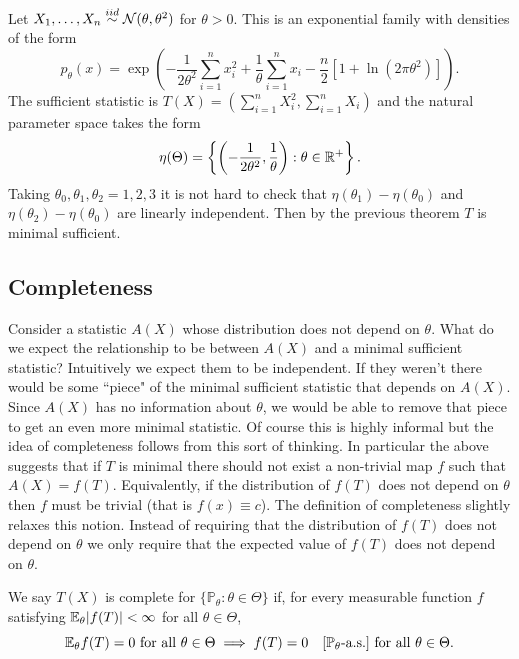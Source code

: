 \begin{example}
	Let $X_1, \dots, X_n \overset{iid}{\sim} \mathcal N(\theta, \theta^2)$ for $\theta > 0$. This is an exponential family with densities of the form \[
	p_\theta(x) =  \exp\left({-\frac{1}{2\theta^2} \sum_{i=1}^n x_i^2  +\frac{1}{\theta}\sum_{i=1}^n x_i} - \frac{n}{2}[1+  \ln(2\pi\theta^2)] \right).
	\] The sufficient statistic is $T(X) = \left(\sum_{i=1}^n X_i^2, \sum_{i=1}^n X_i \right) $ and the natural parameter space takes the form \[
	\eta(\Theta) = \left\{\left(-\frac{1}{2\theta^2}, \frac{1}{\theta}\right) : \theta \in \mathbb{R}^+\right\}. 
	\] Taking $\theta_0, \theta_1, \theta_2 = 1, 2, 3$  it is not hard to check that $\eta(\theta_1) - \eta(\theta_0)$ and $\eta(\theta_2) - \eta(\theta_0)$ are linearly independent.  Then by the previous theorem $T$ is minimal sufficient.
\end{example}

\subsection{Completeness}

Consider a statistic $A(X)$ whose distribution does not depend on $\theta$. What do we expect the relationship to be between $A(X)$ and a minimal sufficient statistic? Intuitively we expect them to be independent. If they weren't there would be some ``piece" of the minimal sufficient statistic that depends on $A(X)$. Since $A(X)$ has no information about $\theta$, we would be able to remove that piece to get an even more minimal statistic. Of course this is highly informal but the idea of completeness follows from this sort of thinking. In particular the above suggests that if $T$ is minimal there should not exist a non-trivial map $f$ such that $A(X) = f(T)$. Equivalently, if the distribution of $f(T)$ does not depend on $\theta$ then $f$ must be trivial (that is $f(x) \equiv c$). The definition of completeness slightly relaxes this notion. Instead of requiring that the distribution of $f(T)$ does not depend on $\theta$  we only require that the expected value of $f(T)$ does not depend on $\theta$.

\begin{definition}
	We say $T(X)$ is complete for $\{\mathbb P_\theta : \theta \in \Theta \}$ if, for every measurable function $f$ satisfying $\mathbb{E}_\theta|f(T)| < \infty$ for all $\theta \in \Theta$, \[
		\mathbb{E}_\theta f(T) = 0 \text{ for all } \theta \in \Theta
		\implies f(T) = 0 \quad [\mathbb P_\theta\text{-a.s.}] \text{ for all } \theta \in \Theta.
	\]
\end{definition} 

